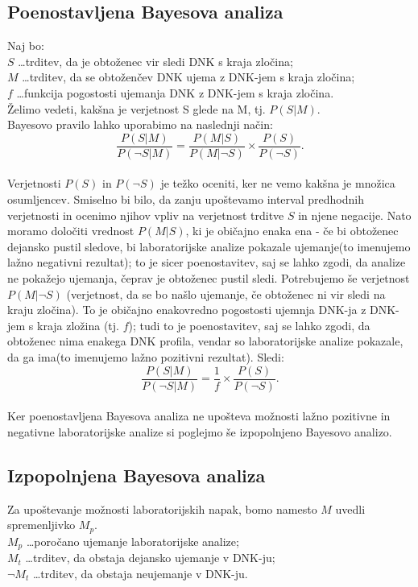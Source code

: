 \documentclass[12pt,a4paper]{amsart}
\theoremstyle{definition} %
\theoremstyle{plain} %
\begin{document}
\subsection{Poenostavljena Bayesova analiza}
Naj bo:\\
$S$ \dots trditev, da je obtoženec vir sledi DNK s kraja zločina; \\
$M$ \dots trditev, da se obtoženčev DNK ujema z DNK-jem s kraja zločina; \\
$f$ \dots funkcija pogostosti ujemanja DNK z DNK-jem s kraja zločina. \\
Želimo vedeti, kakšna je verjetnost S glede na M, tj. $P(S \lvert M)$. \\

Bayesovo pravilo lahko uporabimo na naslednji način:
\[\frac{P(S \lvert M)}{P(\neg S \lvert M)} = \frac{P(M \lvert S)}{P(M \lvert \neg S)} \times \frac{P(S)}{P(\neg S)}.\] \\
Verjetnosti $P(S)$ in $P(\neg S)$ je težko oceniti, ker ne vemo kakšna je množica osumljencev. Smiselno bi bilo, da zanju upoštevamo interval 
predhodnih verjetnosti in ocenimo njihov vpliv na verjetnost trditve $S$ in njene negacije. Nato moramo določiti vrednost $P(M \lvert S)$, ki 
je običajno enaka ena - če bi obtoženec dejansko pustil sledove, bi laboratorijske analize pokazale ujemanje(to imenujemo lažno 
negativni rezultat); to je sicer poenostavitev, saj se lahko zgodi, da analize ne pokažejo ujemanja, čeprav je obtoženec pustil sledi. 
Potrebujemo še verjetnost $P(M \lvert \neg S)$ (verjetnost, da se bo našlo ujemanje, če obtoženec ni vir sledi na kraju zločina). To je 
običajno enakovredno pogostosti ujemnja DNK-ja z DNK-jem s kraja zložina (tj. $f$); tudi to je poenostavitev, saj se lahko zgodi, da 
obtoženec nima enakega DNK profila, vendar so laboratorijske analize pokazale, da ga ima(to imenujemo lažno 
pozitivni rezultat).
Sledi:
\[\frac{P(S \lvert M)}{P(\neg S \lvert M)} = \frac{1}{f} \times \frac{P(S)}{P(\neg S)}.\] \\

Ker poenostavljena Bayesova analiza ne upošteva možnosti lažno pozitivne in negativne laboratorijske analize si poglejmo še izpopolnjeno 
Bayesovo analizo.

\subsection{Izpopolnjena Bayesova analiza}
Za upoštevanje možnosti laboratorijskih napak, bomo namesto $M$ uvedli spremenljivko $M_p$.\\
$M_p$ \dots poročano ujemanje laboratorijske analize; \\
$M_t$ \dots trditev, da obstaja dejansko ujemanje v DNK-ju;\\
$\neg M_t$ \dots trditev, da obstaja neujemanje v DNK-ju.  \\
 
\end{document}
